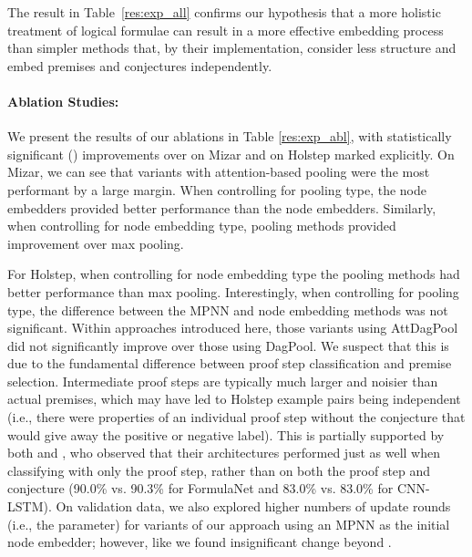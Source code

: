 \documentclass{article}
\begin{document}
The result in Table~\ref{res:exp_all} confirms our hypothesis that a more holistic treatment of logical formulae can result in a more effective embedding process than simpler methods that, by their implementation, consider less structure and embed premises and conjectures independently. 





\paragraph{Ablation Studies:} We present the results of our ablations in Table \ref{res:exp_abl}, with statistically significant () improvements over \cite{kucik2018premise} on Mizar and \cite{wang2017premise} on Holstep marked explicitly. On Mizar, we can see that variants with attention-based pooling were the most performant by a large margin. When controlling for pooling type, the  node embedders provided better performance than the  node embedders. Similarly, when controlling for node embedding type,  pooling methods provided improvement over max pooling.

For Holstep, when controlling for node embedding type the  pooling methods had better performance than max pooling. Interestingly, when controlling for pooling type, the difference between the MPNN and  node embedding methods was not significant. Within approaches introduced here, those variants using AttDagPool did not significantly improve over those using DagPool.
We suspect that this is due to the fundamental difference between proof step classification and premise selection. Intermediate proof steps are typically much larger and noisier than actual premises, which may have led to Holstep example pairs being independent (i.e., there were properties of an individual proof step without the conjecture that would give away the positive or negative label). This is partially supported by both \cite{wang2017premise} and \cite{kaliszyk2017holstep}, who observed that their architectures performed just as well when classifying with only the proof step, rather than on both the proof step and conjecture (90.0\% vs. 90.3\% for FormulaNet and 83.0\% vs. 83.0\% for CNN-LSTM). On validation data, we also explored higher numbers of update rounds (i.e., the  parameter) for variants of our approach using an MPNN as the initial node embedder; however, like \cite{wang2017premise} we found insignificant change beyond .
\end{document}

